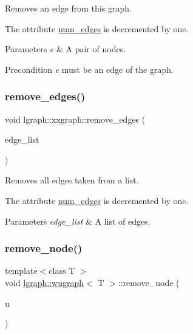 Removes an edge from this graph. 

The attribute \hyperlink{classlgraph_1_1xxgraph_a6765a9a3be42f6e0f824635c593b35d7}{num\+\_\+edges} is decremented by one. 
\begin{DoxyParams}{Parameters}
{\em e} & A pair of nodes. \\
\hline
\end{DoxyParams}
\begin{DoxyPrecond}{Precondition}
{\itshape e} must be an edge of the graph. 
\end{DoxyPrecond}
\mbox{\label{classlgraph_1_1xxgraph_aef7c4bf62f3f4db362b2d3accb3b6d3d}} 
\subsubsection{\texorpdfstring{remove\+\_\+edges()}{remove\_edges()}}
{\footnotesize\ttfamily void lgraph\+::xxgraph\+::remove\+\_\+edges (\begin{DoxyParamCaption}\item[{const std\+::vector$<$ \hyperlink{namespacelgraph_a76bd7d50719f03de7a85db259d80d572}{edge} $>$ \&}]{edge\+\_\+list }\end{DoxyParamCaption})\hspace{0.3cm}{\ttfamily [inherited]}}



Removes all edges taken from a list. 

The attribute \hyperlink{classlgraph_1_1xxgraph_a6765a9a3be42f6e0f824635c593b35d7}{num\+\_\+edges} is decremented by one. 
\begin{DoxyParams}{Parameters}
{\em edge\+\_\+list} & A list of edges. \\
\hline
\end{DoxyParams}
\mbox{\label{classlgraph_1_1wugraph_ad8eff47efc751e7bc5aa10b79ff70633}} 
\subsubsection{\texorpdfstring{remove\+\_\+node()}{remove\_node()}}
{\footnotesize\ttfamily template$<$class T $>$ \\
void \hyperlink{classlgraph_1_1wugraph}{lgraph\+::wugraph}$<$ T $>$\+::remove\+\_\+node (\begin{DoxyParamCaption}\item[{\hyperlink{namespacelgraph_a397169dd66adf725210a30fb7251773e}{node}}]{u }\end{DoxyParamCaption})\hspace{0.3cm}{\ttfamily [virtual]}}



